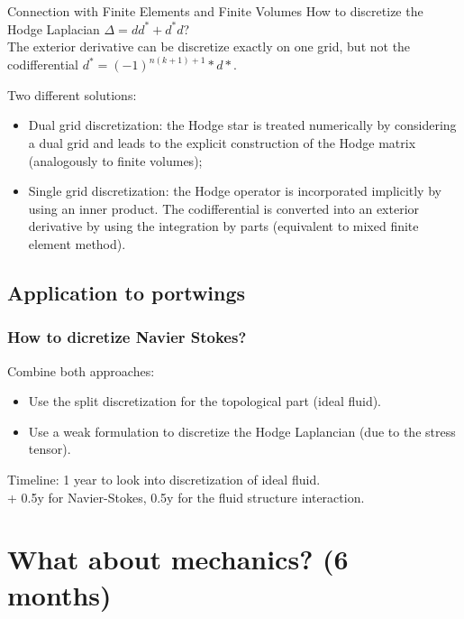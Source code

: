\documentclass{beamer}
\begin{document}
\begin{frame}{Connection with Finite Elements and Finite Volumes}
	How to discretize the Hodge Laplacian $\Delta= dd^* + d^*d$? \\
	The exterior derivative can be discretize exactly on one grid, but not the codifferential $d^* = (-1)^{n(k+1)+1}* d *$. \\
	\vspace{.5cm}
	
	Two different solutions:
	\begin{itemize}
		\item Dual grid discretization: the Hodge star is treated numerically by considering a dual grid and leads to the explicit construction of the Hodge matrix (analogously to finite volumes);
		\item Single grid discretization: the Hodge operator is incorporated implicitly by using an inner product. The codifferential is converted into an exterior derivative by using the integration by parts (equivalent to mixed finite element method).
	\end{itemize}
\end{frame}

\subsection{Application to portwings}

\begin{frame}\frametitle{How to dicretize Navier Stokes?}
	Combine both approaches:
	\begin{itemize}
		\item Use the split discretization for the topological part (ideal fluid).
		\item Use a weak formulation to discretize the Hodge Laplancian (due to the stress tensor).
	\end{itemize}

\vspace{.5cm}
Timeline: 1 year to look into discretization of ideal fluid. \\
 + 0.5y for Navier-Stokes, 0.5y for the fluid structure interaction.

\end{frame}

\section{What about mechanics? (6 months)}
\end{document}
